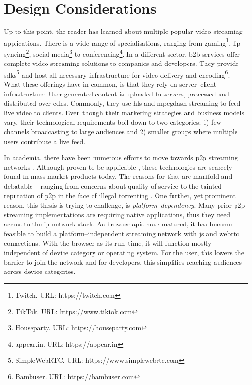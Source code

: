 \section{Design Considerations}

Up to this point, the reader has learned about multiple popular video streaming applications. There is a wide range of specialisations, ranging from gaming\footnote{Twitch. URL: {https://twitch.com}}, lip–syncing\footnote{TikTok. URL: {https://www.tiktok.com}}, social media\footnote{Houseparty. URL: {https://houseparty.com}} to conferencing\footnote{appear.in. URL: {https://appear.in}}. In a different sector, \gls{b2b} services offer complete video streaming solutions to companies and developers. They provide \glspl{sdk}\footnote{SimpleWebRTC. URL: {https://www.simplewebrtc.com}} and host all necessary infrastructure for video delivery and encoding\footnote{Bambuser. URL: {https://bambuser.com}}. What these offerings have in common, is that they rely on server–client infrastructure. User generated content is uploaded to servers, processed and distributed over \glspl{cdn}. Commonly, they use \gls{hls} and \gls{mpegdash} streaming to feed live video to clients. Even though their marketing strategies and business models vary, their technological requirements boil down to two categories: 1) few channels broadcasting to large audiences and 2) smaller groups where multiple users contribute a live feed.

In academia, there have been numerous efforts to move towards \gls{p2p} streaming networks \cite{anysee, coolstreaming, hlpsp}. Although proven to be applicable \cite{skype-p2p-primer, tox-chat-app}, these technologies are scarcely found in mass market products today. The reasons for that are manifold and debatable – ranging from concerns about quality of service \cite{skype-ditching-p2p} to the tainted reputation of \gls{p2p} in the face of illegal torrenting \cite{p2p-social-impact}. One further, yet prominent reason, this thesis is trying to challenge, is \textit{platform–dependency}. Many prior \gls{p2p} streaming implementations are requiring native applications, thus they need access to the \gls{ip} network stack. As browser \glspl{api} have matured, it has become feasible to build a platform–independent streaming network with \gls{js} and \gls{webrtc} connections. With the browser as its run–time, it will function mostly independent of device category or operating system. For the user, this lowers the barrier to join the network and for developers, this simplifies reaching audiences across device categories.
